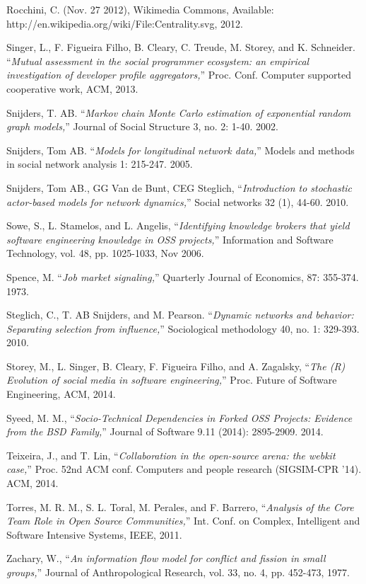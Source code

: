 \begin{thebibliography}{99.}
 Rocchini, C. (Nov. 27 2012), Wikimedia Commons, Available:\\ http://en.wikipedia.org/wiki/File:Centrality.svg, 2012.  

 Singer, L., F. Figueira Filho, B. Cleary, C. Treude, M. Storey, and K. Schneider. ``\textit{Mutual assessment in the social programmer ecosystem: an empirical investigation of developer profile aggregators,}'' Proc. Conf. Computer supported cooperative work, ACM, 2013.

 Snijders, T. AB. ``\textit{Markov chain Monte Carlo estimation of exponential random graph models,}'' Journal of Social Structure 3, no. 2: 1-40. 2002.

 Snijders, Tom AB. ``\textit{Models for longitudinal network data,}'' Models and methods in social network analysis 1: 215-247. 2005.

 Snijders, Tom AB., GG Van de Bunt, CEG Steglich, ``\textit{Introduction to stochastic actor-based models for network dynamics,}'' Social networks 32 (1), 44-60. 2010.

 Sowe, S., L. Stamelos, and L. Angelis, ``\textit{Identifying knowledge brokers that yield software engineering knowledge in OSS projects,}'' Information and Software Technology, vol. 48, pp. 1025-1033, Nov 2006. 

 Spence, M. ``\textit{Job market signaling,}'' Quarterly Journal of Economics, 87: 355-374. 1973.

 Steglich, C., T. AB Snijders, and M. Pearson. ``\textit{Dynamic networks and behavior: Separating selection from influence,}'' Sociological methodology 40, no. 1: 329-393. 2010.

 Storey, M., L. Singer, B. Cleary, F. Figueira Filho, and A. Zagalsky, ``\textit{The (R) Evolution of social media in software engineering,}'' Proc. Future of Software Engineering, ACM, 2014.

 Syeed, M. M., ``\textit{Socio-Technical Dependencies in Forked OSS Projects: Evidence from the BSD Family,}'' Journal of Software 9.11 (2014): 2895-2909. 2014.

 Teixeira, J., and T. Lin, ``\textit{Collaboration in the open-source arena: the webkit case,}'' Proc. 52nd ACM conf. Computers and people research (SIGSIM-CPR '14). ACM, 2014.

 Torres, M. R. M., S. L. Toral, M. Perales, and F. Barrero, ``\textit{Analysis of the Core Team Role in Open Source Communities,}'' Int. Conf. on Complex, Intelligent and Software Intensive Systems, IEEE, 2011. 

 Zachary, W., ``\textit{An information flow model for conflict and fission in small groups,}'' Journal of Anthropological Research, vol. 33, no. 4, pp. 452-473, 1977.

\end{thebibliography}
